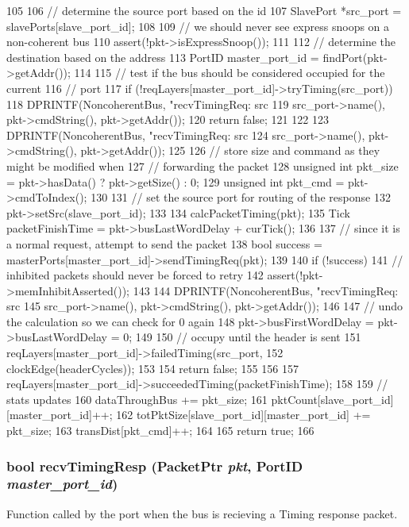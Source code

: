 \begin{DoxyCode}
105 {
106     // determine the source port based on the id
107     SlavePort *src_port = slavePorts[slave_port_id];
108 
109     // we should never see express snoops on a non-coherent bus
110     assert(!pkt->isExpressSnoop());
111 
112     // determine the destination based on the address
113     PortID master_port_id = findPort(pkt->getAddr());
114 
115     // test if the bus should be considered occupied for the current
116     // port
117     if (!reqLayers[master_port_id]->tryTiming(src_port)) {
118         DPRINTF(NoncoherentBus, "recvTimingReq: src %
119                 src_port->name(), pkt->cmdString(), pkt->getAddr());
120         return false;
121     }
122 
123     DPRINTF(NoncoherentBus, "recvTimingReq: src %
124             src_port->name(), pkt->cmdString(), pkt->getAddr());
125 
126     // store size and command as they might be modified when
127     // forwarding the packet
128     unsigned int pkt_size = pkt->hasData() ? pkt->getSize() : 0;
129     unsigned int pkt_cmd = pkt->cmdToIndex();
130 
131     // set the source port for routing of the response
132     pkt->setSrc(slave_port_id);
133 
134     calcPacketTiming(pkt);
135     Tick packetFinishTime = pkt->busLastWordDelay + curTick();
136 
137     // since it is a normal request, attempt to send the packet
138     bool success = masterPorts[master_port_id]->sendTimingReq(pkt);
139 
140     if (!success)  {
141         // inhibited packets should never be forced to retry
142         assert(!pkt->memInhibitAsserted());
143 
144         DPRINTF(NoncoherentBus, "recvTimingReq: src %
145                 src_port->name(), pkt->cmdString(), pkt->getAddr());
146 
147         // undo the calculation so we can check for 0 again
148         pkt->busFirstWordDelay = pkt->busLastWordDelay = 0;
149 
150         // occupy until the header is sent
151         reqLayers[master_port_id]->failedTiming(src_port,
152                                                 clockEdge(headerCycles));
153 
154         return false;
155     }
156 
157     reqLayers[master_port_id]->succeededTiming(packetFinishTime);
158 
159     // stats updates
160     dataThroughBus += pkt_size;
161     pktCount[slave_port_id][master_port_id]++;
162     totPktSize[slave_port_id][master_port_id] += pkt_size;
163     transDist[pkt_cmd]++;
164 
165     return true;
166 }
\end{DoxyCode}
\hypertarget{classNoncoherentBus_a47ba09f9a3b3998cac9c14ab596a7515}{
\subsubsection[{recvTimingResp}]{\setlength{\rightskip}{0pt plus 5cm}bool recvTimingResp ({\bf PacketPtr} {\em pkt}, \/  {\bf PortID} {\em master\_\-port\_\-id})}}
\label{classNoncoherentBus_a47ba09f9a3b3998cac9c14ab596a7515}
Function called by the port when the bus is recieving a Timing response packet. 


